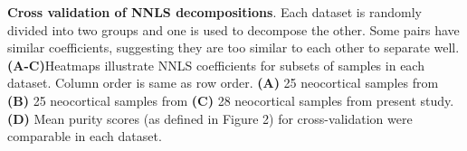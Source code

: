 \textbf{Cross validation of NNLS decompositions}.
 Each dataset is randomly divided into two groups and one is used to decompose the other. Some pairs have similar coefficients, suggesting they are too similar to each other to separate well. \textbf{(A-C)}Heatmaps illustrate NNLS coefficients for subsets of samples in each dataset. Column order is same as row order. \textbf{(A)} 25 neocortical samples from \cite{Tasic_2018} \textbf{(B)} 25 neocortical samples from \cite{Zeisel_2018} \textbf{(C)} 28 neocortical samples from present study. \textbf{(D)} Mean purity scores (as defined in Figure 2) for cross-validation were comparable in each dataset.
 
